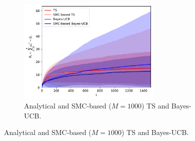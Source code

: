 \begin{figure}[!h]
	\centering
	\begin{subfigure}[b]{\textwidth}
		\centering
		\includegraphics[width=0.75\textwidth]{./fods_figs/static/bernoulli/A5/theta0.3_0.4_0.5_0.7_0.9_M1000_cumulative_regret}
		\caption{Analytical and SMC-based ($M=1000$) TS and Bayes-UCB.}
	\end{subfigure}
	

\end{figure}
